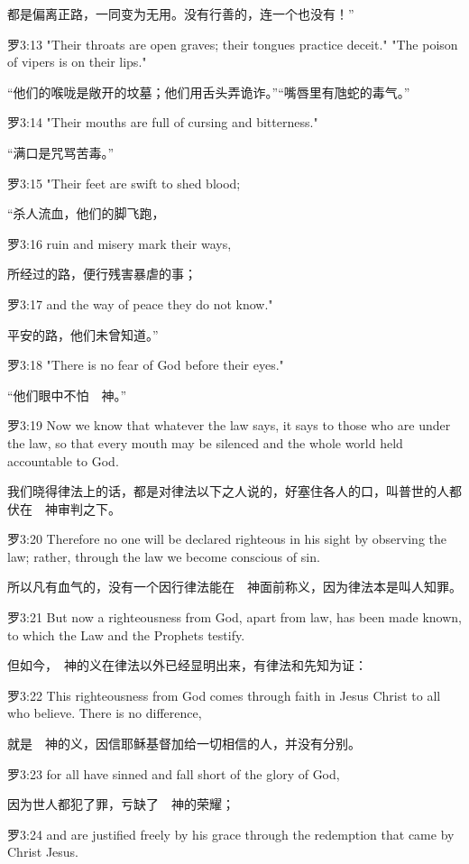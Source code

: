 \documentclass[a4paper,11pt,onecolumn,twoside]{ctexart}
\begin{document}
\begin{multicols}{2}
 都是偏离正路，一同变为无用。没有行善的，连一个也没有！”


 罗3:13
 "Their throats are open graves; their tongues practice deceit." "The poison of vipers is on their lips."

 “他们的喉咙是敞开的坟墓；他们用舌头弄诡诈。”“嘴唇里有虺蛇的毒气。”


 罗3:14
 "Their mouths are full of cursing and bitterness."

 “满口是咒骂苦毒。”


 罗3:15
 "Their feet are swift to shed blood;

 “杀人流血，他们的脚飞跑，


 罗3:16
 ruin and misery mark their ways,

 所经过的路，便行残害暴虐的事；


 罗3:17
 and the way of peace they do not know."

 平安的路，他们未曾知道。”


 罗3:18
 "There is no fear of God before their eyes."

 “他们眼中不怕　神。”


 罗3:19
 Now we know that whatever the law says, it says to those who are under the law, so that every mouth may be silenced and the whole world held accountable to God.

 我们晓得律法上的话，都是对律法以下之人说的，好塞住各人的口，叫普世的人都伏在　神审判之下。


 罗3:20
 Therefore no one will be declared righteous in his sight by observing the law; rather, through the law we become conscious of sin.

 所以凡有血气的，没有一个因行律法能在　神面前称义，因为律法本是叫人知罪。


 罗3:21
 But now a righteousness from God, apart from law, has been made known, to which the Law and the Prophets testify.

 但如今，　神的义在律法以外已经显明出来，有律法和先知为证：


 罗3:22
 This righteousness from God comes through faith in Jesus Christ to all who believe. There is no difference,

 就是　神的义，因信耶稣基督加给一切相信的人，并没有分别。


 罗3:23
 for all have sinned and fall short of the glory of God,

 因为世人都犯了罪，亏缺了　神的荣耀；


 罗3:24
 and are justified freely by his grace through the redemption that came by Christ Jesus.


\end{multicols}
\end{document}
